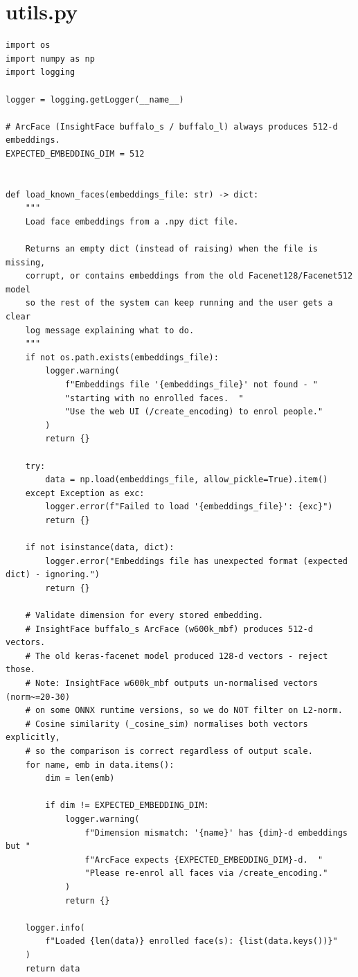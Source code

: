 \documentclass[12pt,a4paper]{report}
\begin{document}
\section{utils.py}
\begin{lstlisting}
import os
import numpy as np
import logging

logger = logging.getLogger(__name__)

# ArcFace (InsightFace buffalo_s / buffalo_l) always produces 512-d embeddings.
EXPECTED_EMBEDDING_DIM = 512


def load_known_faces(embeddings_file: str) -> dict:
    """
    Load face embeddings from a .npy dict file.

    Returns an empty dict (instead of raising) when the file is missing,
    corrupt, or contains embeddings from the old Facenet128/Facenet512 model
    so the rest of the system can keep running and the user gets a clear
    log message explaining what to do.
    """
    if not os.path.exists(embeddings_file):
        logger.warning(
            f"Embeddings file '{embeddings_file}' not found - "
            "starting with no enrolled faces.  "
            "Use the web UI (/create_encoding) to enrol people."
        )
        return {}

    try:
        data = np.load(embeddings_file, allow_pickle=True).item()
    except Exception as exc:
        logger.error(f"Failed to load '{embeddings_file}': {exc}")
        return {}

    if not isinstance(data, dict):
        logger.error("Embeddings file has unexpected format (expected dict) - ignoring.")
        return {}

    # Validate dimension for every stored embedding.
    # InsightFace buffalo_s ArcFace (w600k_mbf) produces 512-d vectors.
    # The old keras-facenet model produced 128-d vectors - reject those.
    # Note: InsightFace w600k_mbf outputs un-normalised vectors (norm~=20-30)
    # on some ONNX runtime versions, so we do NOT filter on L2-norm.
    # Cosine similarity (_cosine_sim) normalises both vectors explicitly,
    # so the comparison is correct regardless of output scale.
    for name, emb in data.items():
        dim = len(emb)

        if dim != EXPECTED_EMBEDDING_DIM:
            logger.warning(
                f"Dimension mismatch: '{name}' has {dim}-d embeddings but "
                f"ArcFace expects {EXPECTED_EMBEDDING_DIM}-d.  "
                "Please re-enrol all faces via /create_encoding."
            )
            return {}

    logger.info(
        f"Loaded {len(data)} enrolled face(s): {list(data.keys())}"
    )
    return data
\end{lstlisting}
\end{document}
